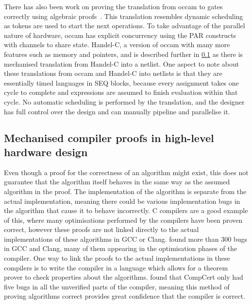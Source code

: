 There has also been work on proving the translation from occam to
gates~\cite{page91_compil_occam} correctly using algebraic
proofs~\cite{jifeng93_towar}.  This translation resembles dynamic scheduling as
tokens are used to start the next operations.  To take advantage of the parallel
nature of hardware, occam has explicit concurrency using the PAR constructs with
channels to share state.  Handel-C, a version of occam with many more features
such as memory and pointers, and is described further in
\cref{sec:bg:mechanised-compiler-proofs} as there is mechanised translation from
Handel-C into a netlist.  One aspect to note about these translations from occam
and Handel-C into netlists is that they are essentially timed languages in SEQ
blocks, because every assignment takes one cycle to complete and expressions are
assumed to finish evaluation within that cycle.  No automatic scheduling is
performed by the translation, and the designer has full control over the design
and can manually pipeline and parallelise it.

\subsection{Mechanised compiler proofs in high-level hardware design}%
\label{sec:bg:mechanised-compiler-proofs}

Even though a proof for the correctness of an algorithm might exist, this does
not guarantee that the algorithm itself behaves in the same way as the assumed
algorithm in the proof.  The implementation of the algorithm is separate from
the actual implementation, meaning there could be various implementation bugs in
the algorithm that cause it to behave incorrectly.  C compilers are a good
example of this, where many optimisations performed by the compilers have been
proven correct, however these proofs are not linked directly to the actual
implementations of these algorithms in GCC or Clang.
\textcite{yang11_findin_under_bugs_c_compil} found more than 300 bugs in GCC and
Clang, many of them appearing in the optimisation phases of the compiler.  One
way to link the proofs to the actual implementations in these compilers is to
write the compiler in a language which allows for a theorem prover to check
properties about the algorithms.  \citeauthor{yang11_findin_under_bugs_c_compil}
found that CompCert only had five bugs in all the unverified parts of the
compiler, meaning this method of proving algorithms correct provides great
confidence that the compiler is correct.

